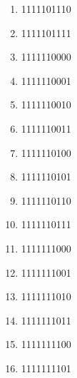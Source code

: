 \documentclass{mylib/reporte}
\begin{document}
\begin{multicols}{4}
\begin{enumerate}
	\item  1111101110
	\item  1111101111
	\item  1111110000
	\item  1111110001
	\item  1111110010
	\item  1111110011
	\item  1111110100
	\item  1111110101
	\item  1111110110
	\item  1111110111
	\item  1111111000
	\item  1111111001
	\item  1111111010
	\item  1111111011
	\item  1111111100
	\item  1111111101
	\end{enumerate}

\end{multicols}
\end{document}
